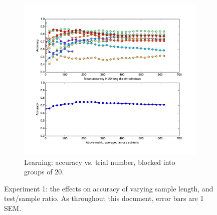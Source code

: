 \begin{figure}[htp]
\centering
\begin{subfigure}[b]{\textwidth}
\centering
                \includegraphics[width=12cm]{img/fig_fire3accuracyWalkingWindow.pdf}
                \caption{Learning: accuracy vs. trial number, blocked into groups of 20.}
      		\label{f:e1:learn}
        \end{subfigure}
\caption{Experiment 1: the effects on accuracy of varying sample length, and test/sample ratio. As throughout this document, error bars are 1 SEM.}
\end{figure}